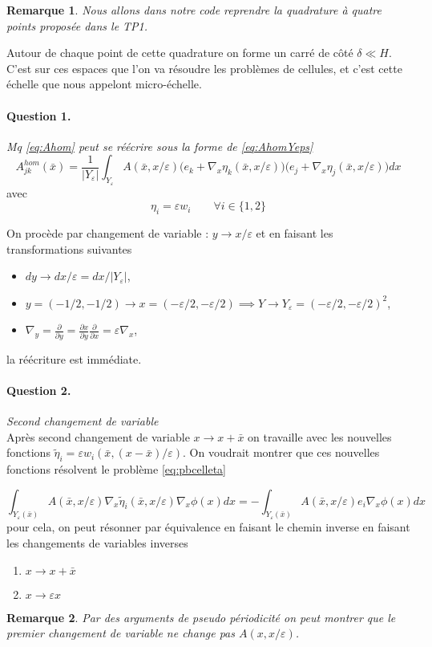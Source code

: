 \documentclass[11pt]{article}
\newtheorem{rmq}{Remarque}
\newcommand{\Ah}{A^{hom}}
\newcommand{\bx}{\bar{x}}
\newcommand{\teta}{\tilde{\eta}}
\newcommand{\Ye}{Y_\varepsilon}
\newcommand{\question}[2]{\paragraph{Question #1.}\textit{#2} \\}
\begin{document}
\begin{rmq}
  Nous allons dans notre code reprendre la quadrature à quatre points proposée dans le TP1.
\end{rmq}

Autour de chaque point de cette quadrature on forme un carré de côté $\delta \ll H$. C'est sur ces espaces que l'on va résoudre les problèmes de
cellules, et c'est cette échelle que nous appelont micro-échelle.



\question{1}{Mq \autoref{eq:Ahom} peut se réécrire sous la forme de \autoref{eq:AhomYeps}}

\begin{equation}
  \label{eq:AhomYeps}
  \Ah_{jk}(\bx) = \frac{1}{|\Ye|}
  \int_{\Ye} A(\bx, x/\varepsilon) \big(e_k+\nabla_x \eta_k(\bx, x/\varepsilon)\big)\big(e_j+\nabla_x \eta_j(\bx, x/\varepsilon)\big) dx
\end{equation}
avec 
\[
  \eta_i = \varepsilon w_i \qquad \forall i \in \{1,2\}
\]

On procède par changement de variable : $ y \rightarrow x/\varepsilon $ et en faisant les transformations suivantes
\begin{itemize}
\item $dy \rightarrow dx/\varepsilon = dx/|\Ye|$,
\item $y=(-1/2, -1/2) \rightarrow x=(-\varepsilon/2, -\varepsilon/2) \implies Y \rightarrow \Ye = (-\varepsilon/2, -\varepsilon/2)^2$,
\item $\nabla_y = \frac{\partial}{\partial y} = \frac{\partial x}{\partial y}\frac{\partial}{\partial x} = \varepsilon \nabla_x $,
\end{itemize}
la réécriture est immédiate.

\question{2}{Second changement de variable}
Après second changement de variable $x\rightarrow x +\bx$ on travaille avec les nouvelles fonctions $\teta_i = \varepsilon w_i(\bx, (x-\bx)/\varepsilon)$.
On voudrait montrer que ces nouvelles fonctions résolvent le problème \autoref{eq:pbcelleta}

\begin{equation}
  \label{eq:pbcellteta}
  \int_{\Ye(\bx)} A(\bx, x/\varepsilon)\nabla_x \teta_i(\bx, x/\varepsilon) \nabla_x \phi(x) dx =
  - \int_{\Ye(\bx)} A(\bx, x/\varepsilon) e_i \nabla_x \phi(x) dx
\end{equation}
pour cela, on peut résonner par équivalence en faisant le chemin inverse en faisant les changements de variables inverses
\begin{enumerate}
\item $x\rightarrow x+\bx$
\item $x\rightarrow \varepsilon x$
\end{enumerate}
\begin{rmq}
  Par des arguments de pseudo périodicité on peut montrer que le premier changement de variable ne change pas $A(x, x/\varepsilon)$.
\end{rmq}
\end{document}
